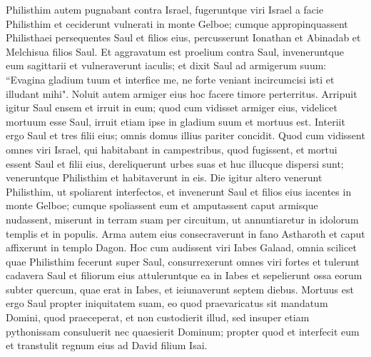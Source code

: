 \begin{biblechapter}  
\verse Philisthim autem pugnabant contra Israel, fugeruntque viri Israel a facie Philisthim et ceciderunt vulnerati in monte Gelboe; 
\verse cumque appropinquassent Philisthaei persequentes Saul et filios eius, percusserunt Ionathan et Abinadab et Melchisua filios Saul. 
\verse Et aggravatum est proelium contra Saul, inveneruntque eum sagittarii et vulneraverunt iaculis; 
\verse et dixit Saul ad armigerum suum: “Evagina gladium tuum et interfice me, ne forte veniant incircumcisi isti et illudant mihi". Noluit autem armiger eius hoc facere timore perterritus. Arripuit igitur Saul ensem et irruit in eum; 
\verse quod cum vidisset armiger eius, videlicet mortuum esse Saul, irruit etiam ipse in gladium suum et mortuus est. 
\verse Interiit ergo Saul et tres filii eius; omnis domus illius pariter concidit. 
\verse Quod cum vidissent omnes viri Israel, qui habitabant in campestribus, quod fugissent, et mortui essent Saul et filii eius, dereliquerunt urbes suas et huc illucque dispersi sunt; veneruntque Philisthim et habitaverunt in eis. 
\verse Die igitur altero venerunt Philisthim, ut spoliarent interfectos, et invenerunt Saul et filios eius iacentes in monte Gelboe; 
\verse cumque spoliassent eum et amputassent caput armisque nudassent, miserunt in terram suam per circuitum, ut annuntiaretur in idolorum templis et in populis. 
\verse Arma autem eius consecraverunt in fano Astharoth et caput affixerunt in templo Dagon. 
\verse Hoc cum audissent viri Iabes Galaad, omnia scilicet quae Philisthim fecerunt super Saul, 
\verse consurrexerunt omnes viri fortes et tulerunt cadavera Saul et filiorum eius attuleruntque ea in Iabes et sepelierunt ossa eorum subter quercum, quae erat in Iabes, et ieiunaverunt septem diebus. 
\verse Mortuus est ergo Saul propter iniquitatem suam, eo quod praevaricatus sit mandatum Domini, quod praeceperat, et non custodierit illud, sed insuper etiam pythonissam consuluerit 
\verse nec quaesierit Dominum; propter quod et interfecit eum et transtulit regnum eius ad David filium Isai. 
\end{biblechapter}

